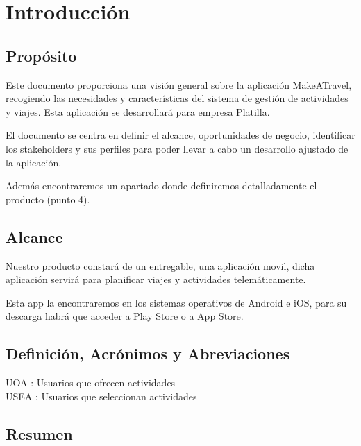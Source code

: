 \documentclass[11pt]{article}
\begin{document}
\tableofcontents
\newpage

\section{Introducción}
\subsection{Propósito}
Este documento proporciona una visión general sobre la aplicación MakeATravel, recogiendo las necesidades y características del sistema de gestión de actividades y viajes. Esta aplicación se desarrollará para empresa Platilla.

El documento se centra en definir el alcance, oportunidades de negocio, identificar los stakeholders y sus perfiles para poder llevar a cabo un desarrollo ajustado de la aplicación.

Además encontraremos un apartado donde definiremos detalladamente el producto (punto 4).


\subsection{Alcance}
Nuestro producto constará de un entregable, una aplicación movil, dicha aplicación servirá para planificar viajes y actividades telemáticamente.

Esta app la encontraremos en los sistemas operativos de Android e iOS, para su descarga habrá que acceder a Play Store o a App Store. 

\subsection{Definición, Acrónimos y Abreviaciones}
UOA : Usuarios que ofrecen actividades\\

USEA : Usuarios que seleccionan actividades 

\subsection{Resumen}
\newpage

\end{document}
